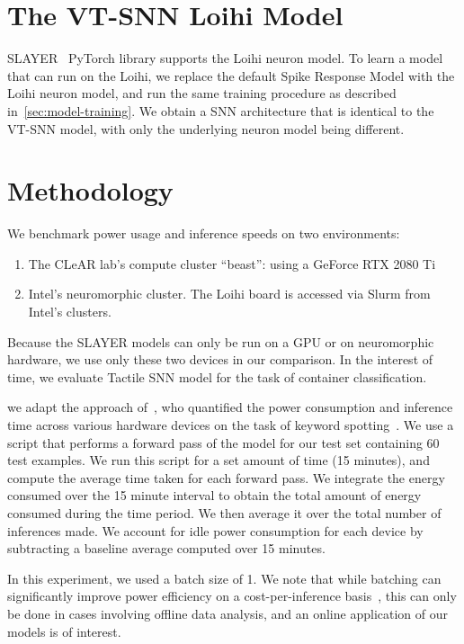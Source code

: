 \documentclass[fyp]{socreport}
\begin{document}
\section{The VT-SNN Loihi Model}

SLAYER~\cite{NIPS2018_7415} PyTorch library supports the Loihi neuron model. To
learn a model that can run on the Loihi, we replace the default Spike Response
Model with the Loihi neuron model, and run the same training procedure as
described in~\autoref{sec:model-training}. We obtain a SNN architecture that is
identical to the VT-SNN model, with only the underlying neuron model being
different.

\section{Methodology}
We benchmark power usage and inference speeds on two environments:

\begin{enumerate}
  \item The CLeAR lab's compute cluster ``beast'': using a GeForce RTX 2080 Ti
  \item Intel's neuromorphic cluster. The Loihi board is accessed via Slurm from
    Intel's clusters.
\end{enumerate}

Because the SLAYER models can only be run on a GPU or on neuromorphic hardware,
we use only these two devices in our comparison. In the interest of time, we
evaluate Tactile SNN model for the task of container classification.

we adapt the approach
of~\citeauthor{blouw18_bench_keywor_spott_effic_neurom_hardw}, who quantified
the power consumption and inference time across various hardware devices on the
task of keyword spotting~\cite{blouw18_bench_keywor_spott_effic_neurom_hardw}.
We use a script that performs a forward pass of the model for our test set
containing 60 test examples. We run this script for a set amount of time (15
minutes), and compute the average time taken for each forward pass. We integrate
the energy consumed over the 15 minute interval to obtain the total amount of
energy consumed during the time period. We then average it over the total number
of inferences made. We account for idle power consumption for each device by
subtracting a baseline average computed over 15 minutes.

In this experiment, we used a batch size of 1. We note that while batching can
significantly improve power efficiency on a cost-per-inference
basis~\cite{blouw18_bench_keywor_spott_effic_neurom_hardw}, this can only be
done in cases involving offline data analysis, and an online application of our
models is of interest.
\end{document}
